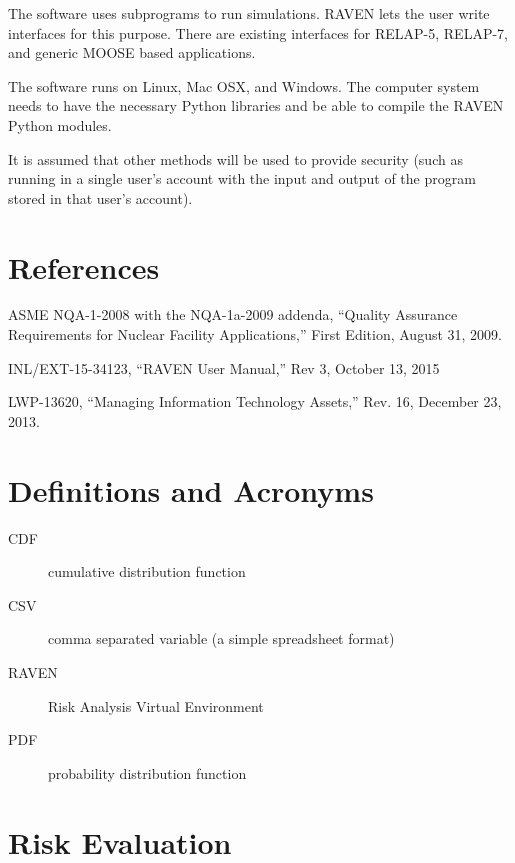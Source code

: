 \documentclass{article}
\begin{document}
The software uses subprograms to run simulations.  RAVEN lets the user
write interfaces for this purpose.  There are existing interfaces for
RELAP-5, RELAP-7, and generic MOOSE based applications.

The software runs on Linux, Mac OSX, and Windows.  The computer system
needs to have the necessary Python libraries and be able to compile
the RAVEN Python modules.

It is assumed that other methods will be used to provide security
(such as running in a single user's account with the input and output
of the program stored in that user's account).

\section{References}

\begin{flushleft}
ASME NQA-1-2008 with the NQA-1a-2009 addenda, ``Quality Assurance
Requirements for Nuclear Facility Applications,'' First Edition, August
31, 2009.

INL/EXT-15-34123, ``RAVEN User Manual,'' Rev 3, October 13, 2015

LWP-13620, ``Managing Information Technology Assets,'' Rev. 16, December
23, 2013.
\end{flushleft}

\section{Definitions and Acronyms}

\begin{description}
\item[CDF] cumulative distribution function
\item[CSV] comma separated variable (a simple spreadsheet format)
\item[RAVEN] Risk Analysis Virtual Environment
\item[PDF] probability distribution function
\end{description}

\section{Risk Evaluation}
\end{document}
